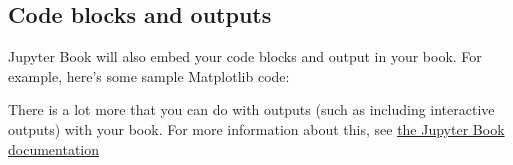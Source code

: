 \hypertarget{code-blocks-and-outputs}{%
\subsection{Code blocks and outputs}\label{code-blocks-and-outputs}}

Jupyter Book will also embed your code blocks and output in your book.
For example, here's some sample Matplotlib code:

    There is a lot more that you can do with outputs (such as including
interactive outputs) with your book. For more information about this,
see \href{https://jupyterbook.org}{the Jupyter Book documentation}


    
    
    
